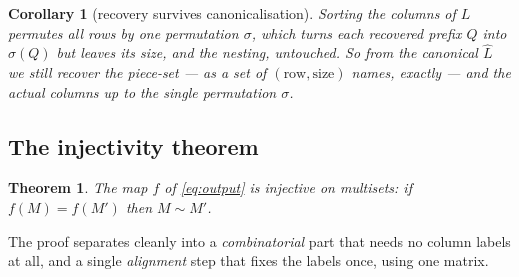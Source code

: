 \documentclass[11pt,a4paper]{article}
\theoremstyle{definition}
\theoremstyle{plain}
\newtheorem{theorem}[definition]{Theorem}
\newtheorem{corollary}[definition]{Corollary}
\newcommand{\bary}{\widehat}      %
\begin{document}
\begin{corollary}[recovery survives canonicalisation]\label{cor:survive}
Sorting the columns of $L$ permutes all rows by one permutation $\sigma$, which
turns each recovered prefix $Q$ into $\sigma(Q)$ but leaves its \emph{size}, and
the \emph{nesting}, untouched. So from the canonical $\bary L$ we still recover
the piece-set --- as a set of $(\text{row},\text{size})$ names, exactly --- and
the actual columns up to the single permutation $\sigma$.
\end{corollary}

\subsection{The injectivity theorem}

\begin{theorem}\label{thm:inj}
The map $f$ of \eqref{eq:output} is injective on multisets: if $f(M)=f(M')$ then
$M\sim M'$.
\end{theorem}

The proof separates cleanly into a \emph{combinatorial} part that needs no
column labels at all, and a single \emph{alignment} step that fixes the labels
once, using one matrix.
\end{document}

